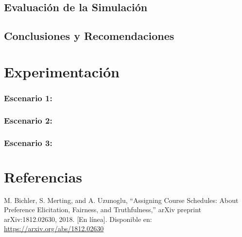 \documentclass{article}
\begin{document}
\subsection{Evaluación de la Simulación}


\subsection{Conclusiones y Recomendaciones}



\section{Experimentación}\label{sec:exp}

\subsubsection{Escenario 1: }

\subsubsection{Escenario 2: }

\subsubsection{Escenario 3: }


\section{Referencias}
\renewcommand{\refname}{}

\begin{thebibliography}{9}

   \label{ref:BPS} M. Bichler, S. Merting, and A. Uzunoglu,
  “Assigning Course Schedules: About Preference Elicitation, Fairness, and Truthfulness,”
  arXiv preprint arXiv:1812.02630, 2018. [En línea]. Disponible en:
  \url{https://arxiv.org/abs/1812.02630}


\end{thebibliography}
\end{document}
